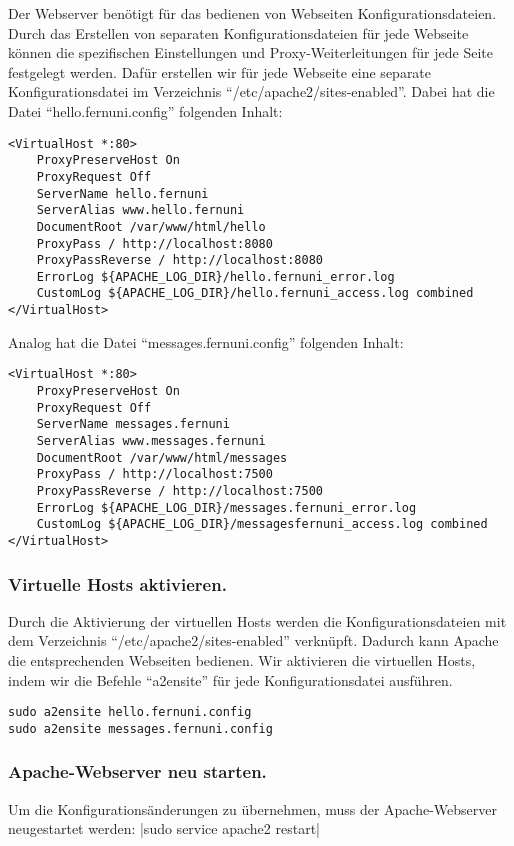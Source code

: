 Der Webserver benötigt für das bedienen von Webseiten Konfigurationsdateien.
Durch das Erstellen von separaten Konfigurationsdateien für jede Webseite können die spezifischen Einstellungen und Proxy-Weiterleitungen für jede Seite festgelegt werden.
Dafür erstellen wir für jede Webseite eine separate Konfigurationsdatei im Verzeichnis \enquote{/etc/apache2/sites-enabled}. 
Dabei hat die Datei \enquote{hello.fernuni.config} folgenden Inhalt:
\begin{verbatim}
<VirtualHost *:80> 
    ProxyPreserveHost On
    ProxyRequest Off
    ServerName hello.fernuni 
    ServerAlias www.hello.fernuni 
    DocumentRoot /var/www/html/hello
    ProxyPass / http://localhost:8080
    ProxyPassReverse / http://localhost:8080
    ErrorLog ${APACHE_LOG_DIR}/hello.fernuni_error.log
    CustomLog ${APACHE_LOG_DIR}/hello.fernuni_access.log combined
</VirtualHost>
\end{verbatim}

Analog hat die Datei \enquote{messages.fernuni.config} folgenden Inhalt:
\begin{verbatim}
<VirtualHost *:80> 
    ProxyPreserveHost On
    ProxyRequest Off
    ServerName messages.fernuni 
    ServerAlias www.messages.fernuni 
    DocumentRoot /var/www/html/messages
    ProxyPass / http://localhost:7500
    ProxyPassReverse / http://localhost:7500
    ErrorLog ${APACHE_LOG_DIR}/messages.fernuni_error.log
    CustomLog ${APACHE_LOG_DIR}/messagesfernuni_access.log combined
</VirtualHost>
\end{verbatim}

\subsubsection*{Virtuelle Hosts aktivieren.}
Durch die Aktivierung der virtuellen Hosts werden die Konfigurationsdateien mit dem Verzeichnis \enquote{/etc/apache2/sites-enabled} verknüpft. Dadurch kann Apache die entsprechenden Webseiten bedienen.
Wir aktivieren die virtuellen Hosts, indem wir die Befehle \enquote{a2ensite} für jede Konfigurationsdatei ausführen.

\begin{verbatim}
sudo a2ensite hello.fernuni.config
sudo a2ensite messages.fernuni.config
\end{verbatim}

\subsubsection*{Apache-Webserver neu starten.}
Um die Konfigurationsänderungen zu übernehmen, muss der Apache-Webserver neugestartet werden:
|sudo service apache2 restart|

